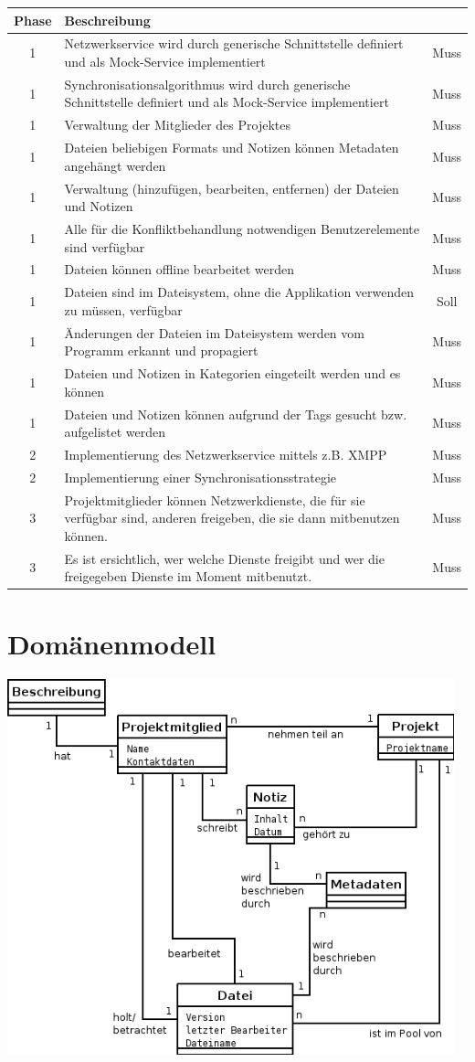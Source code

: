 \begin{tabular}{ | c | p{10.5cm} | c |}
\hline
\textbf{Phase} & \textbf{Beschreibung} & \textbf{}\\
\hline
1 & Netzwerkservice wird durch generische Schnittstelle definiert und als Mock-Service implementiert & Muss\\
\hline
1 & Synchronisationsalgorithmus wird durch generische Schnittstelle definiert und als Mock-Service implementiert & Muss\\
\hline
1 & Verwaltung der Mitglieder des Projektes & Muss\\
\hline
1 & Dateien beliebigen Formats und Notizen können Metadaten angehängt werden & Muss\\
\hline
1 & Verwaltung (hinzufügen, bearbeiten, entfernen) der Dateien und Notizen & Muss\\
\hline
1 & Alle für die Konfliktbehandlung notwendigen Benutzerelemente sind verfügbar & Muss\\
\hline
1 & Dateien können offline bearbeitet werden & Muss\\
\hline
1 & Dateien sind im Dateisystem, ohne die Applikation verwenden zu müssen, verfügbar & Soll\\
\hline
1 & Änderungen der Dateien im Dateisystem werden vom Programm erkannt und propagiert & Muss\\
\hline
1 & Dateien und Notizen in Kategorien eingeteilt werden und es können & Muss\\
\hline
1 & Dateien und Notizen können aufgrund der Tags gesucht bzw. aufgelistet werden & Muss\\
\hline
2 & Implementierung des Netzwerkservice mittels z.B. XMPP & Muss\\
\hline
2 & Implementierung einer Synchronisationsstrategie & Muss\\
\hline
3 & Projektmitglieder können Netzwerkdienste, die für sie verfügbar sind, anderen freigeben, die sie dann mitbenutzen können. & Muss\\
\hline
3 & Es ist ersichtlich, wer welche Dienste freigibt und wer die freigegeben Dienste im Moment mitbenutzt. & Muss\\
\hline
\end{tabular} 

\section{Domänenmodell}
\includegraphics[width=0.97\textwidth]{../uml/domain_model.png}
